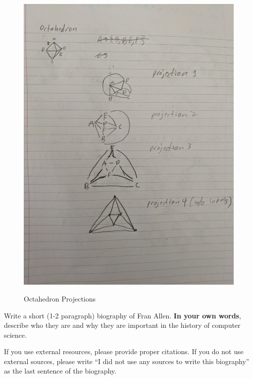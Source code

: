 \documentclass{article}
\begin{document}
\begin{enumerate}
\begin{figure}
\caption{Octahedron Projections}
\centering
\includegraphics[width=\textwidth,angle=-90]{images/octahedron}
\label{graph}
\end{figure}



\end{enumerate}


Write a short (1-2 paragraph) biography of Fran Allen.
\textbf{In your own words}, describe who they are and why they are important in
the history of computer science.

If you use external resources, please provide
proper citations. If you do not use external sources, please write ``I did not
use any sources to write this biography'' as the last sentence of the
biography.
\end{document}
